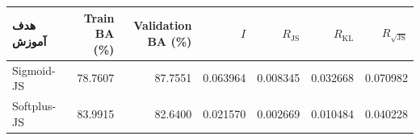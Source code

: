 \begin{tabular}{lrrrrrr}
\hline
هدف آموزش & Train BA (\%) & Validation BA (\%) & $I$ & $R_{\mathrm{JS}}$ & $R_{\mathrm{KL}}$ & $R_{\sqrt{\mathrm{JS}}}$ \\
\hline
Sigmoid-JS & 78.7607 & 87.7551 & 0.063964 & 0.008345 & 0.032668 & 0.070982 \\
Softplus-JS & 83.9915 & 82.6400 & 0.021570 & 0.002669 & 0.010484 & 0.040228 \\
\hline
\end{tabular}
